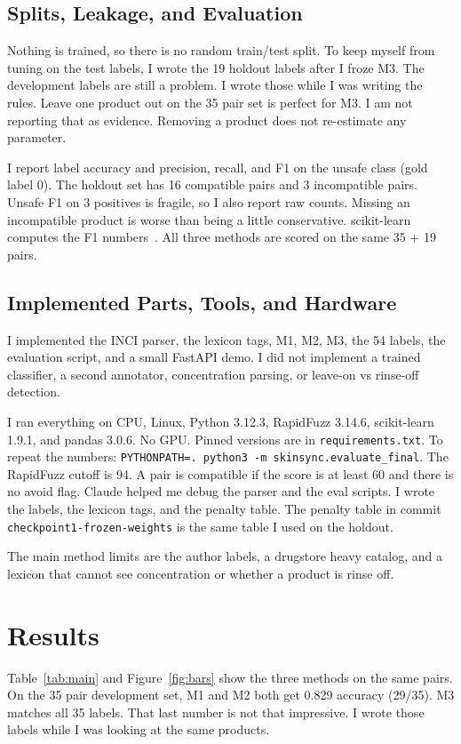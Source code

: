 \documentclass[conference]{IEEEtran}
\begin{document}
\subsection{Splits, Leakage, and Evaluation}
Nothing is trained, so there is no random train/test split. To keep myself from tuning on the test labels, I wrote the 19 holdout labels after I froze M3. The development labels are still a problem. I wrote those while I was writing the rules. Leave one product out on the 35 pair set is perfect for M3. I am not reporting that as evidence. Removing a product does not re-estimate any parameter.

I report label accuracy and precision, recall, and F1 on the unsafe class (gold label 0). The holdout set has 16 compatible pairs and 3 incompatible pairs. Unsafe F1 on 3 positives is fragile, so I also report raw counts. Missing an incompatible product is worse than being a little conservative. scikit-learn computes the F1 numbers~\cite{pedregosa2011sklearn}. All three methods are scored on the same 35 + 19 pairs.

\subsection{Implemented Parts, Tools, and Hardware}
I implemented the INCI parser, the lexicon tags, M1, M2, M3, the 54 labels, the evaluation script, and a small FastAPI demo. I did not implement a trained classifier, a second annotator, concentration parsing, or leave-on vs rinse-off detection.

I ran everything on CPU, Linux, Python 3.12.3, RapidFuzz 3.14.6, scikit-learn 1.9.1, and pandas 3.0.6. No GPU. Pinned versions are in \texttt{requirements.txt}. To repeat the numbers: \texttt{PYTHONPATH=. python3 -m skinsync.evaluate\_final}. The RapidFuzz cutoff is 94. A pair is compatible if the score is at least 60 and there is no avoid flag. Claude helped me debug the parser and the eval scripts. I wrote the labels, the lexicon tags, and the penalty table. The penalty table in commit \texttt{checkpoint1-frozen-weights} is the same table I used on the holdout.

The main method limits are the author labels, a drugstore heavy catalog, and a lexicon that cannot see concentration or whether a product is rinse off.

\section{Results}
Table~\ref{tab:main} and Figure~\ref{fig:bars} show the three methods on the same pairs. On the 35 pair development set, M1 and M2 both get 0.829 accuracy (29/35). M3 matches all 35 labels. That last number is not that impressive. I wrote those labels while I was looking at the same products.
\end{document}
